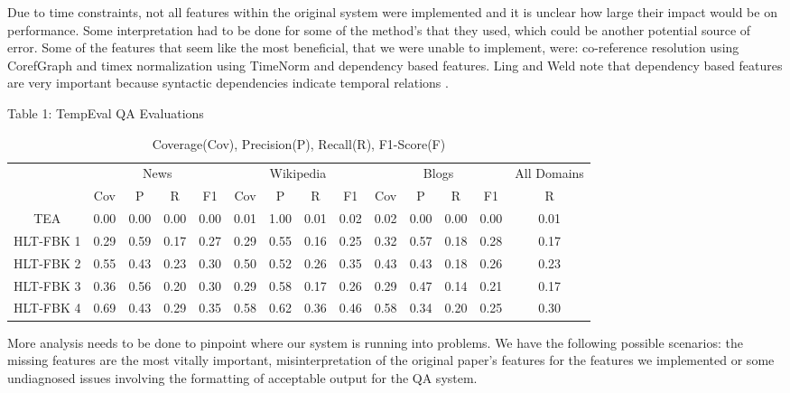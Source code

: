 \documentclass[11pt,letterpaper]{article}
\begin{document}
Due to time constraints, not all features within the original system were implemented and it is unclear how large their impact would be on performance. Some interpretation had to be done for some of the method's that they used, which could be another potential source of error. Some of the features that seem like the most beneficial, that we were unable to implement, were: co-reference resolution using CorefGraph and timex normalization using TimeNorm and dependency based features. Ling and Weld note that dependency based features are very important because syntactic dependencies indicate temporal relations \cite{Ling:25}.

\begin{table}[b]{Table 1: TempEval QA Evaluations}
\centering

\begin{tabular}{c|cccc|cccc|cccc||c}

\multirow{2}{*}{} &
	\multicolumn{4}{c}{News} & 
	\multicolumn{4}{|c}{Wikipedia} & 
	\multicolumn{4}{|c||}{Blogs} & 
	\multicolumn{1}{c}{All Domains} \\
	
	& Cov & P & R & F1 
	& Cov & P & R & F1 
	& Cov & P & R & F1 
	& R\\
	\hline

	TEA & 
	0.00 & 0.00 & 0.00 & 0.00 & 
	0.01 & 1.00 & 0.01 & 0.02 & 
	0.02 & 0.00 & 0.00 & 0.00 & 
	0.01 \\

	HLT-FBK 1 &
	0.29 & 0.59 & 0.17 & 0.27 &
	0.29 & 0.55 & 0.16 & 0.25 &
	0.32 & 0.57 & 0.18 & 0.28 &
	0.17 \\
	
	HLT-FBK 2 &
	0.55 & 0.43 & 0.23 & 0.30 &
	0.50 & 0.52 & 0.26 & 0.35 &
	0.43 & 0.43 & 0.18 & 0.26 &
	0.23 \\
	
	HLT-FBK 3 &
	0.36 & 0.56 & 0.20 & 0.30 &
	0.29 & 0.58 & 0.17 & 0.26 &
	0.29 & 0.47 & 0.14 & 0.21 &
	0.17 \\
	
	HLT-FBK 4 &
	0.69 & 0.43 & 0.29 & 0.35 &
	0.58 & 0.62 & 0.36 & 0.46 &
	0.58 & 0.34 & 0.20 & 0.25 & 
	0.30 \\

\end{tabular}

\caption*{Coverage(Cov), Precision(P), Recall(R), F1-Score(F)}

\end{table}

More analysis needs to be done to pinpoint where our system is running into problems. We have the following possible scenarios: the missing features are the most vitally important, misinterpretation of the original paper's features for the features we implemented or some undiagnosed issues involving the formatting of acceptable output for the QA system. 
\end{document}
